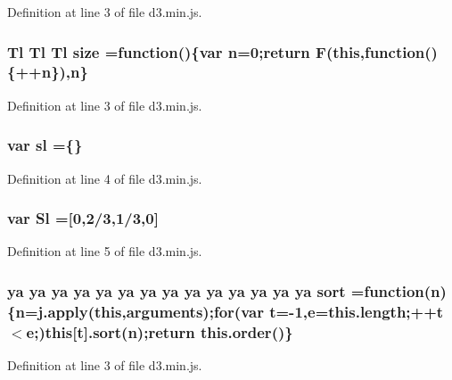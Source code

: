 Definition at line 3 of file d3.\+min.\+js.

\subsubsection[{size}]{ {\bf Tl} {\bf Tl} {\bf Tl} size =function()\{var {\bf n}=0;{\bf return} F({\bf this},function()\{++{\bf n}\}),{\bf n}\}}\label{d3_8min_8js_a8401d8331e4ea8db4ff155652d0778e8}


Definition at line 3 of file d3.\+min.\+js.

\subsubsection[{sl}]{\setlength{\rightskip}{0pt plus 5cm}var sl =\{\}}\label{d3_8min_8js_a22ed058533e24c768f8dc8118e8b648e}


Definition at line 4 of file d3.\+min.\+js.

\subsubsection[{Sl}]{\setlength{\rightskip}{0pt plus 5cm}var Sl =[0,2/3,1/3,0]}\label{d3_8min_8js_aaea013a5b5b0ff043bbedf3b923f4726}


Definition at line 5 of file d3.\+min.\+js.

\subsubsection[{sort}]{ {\bf ya} {\bf ya} {\bf ya} {\bf ya} {\bf ya} {\bf ya} {\bf ya} {\bf ya} {\bf ya} {\bf ya} {\bf ya} {\bf ya} {\bf ya} {\bf ya} sort =function({\bf n})\{{\bf n}=j.\+apply({\bf this},arguments);{\bf for}(var t=-\/1,{\bf e}=this.\+length;++t$<${\bf e};){\bf this}[t].sort({\bf n});{\bf return} {\bf this.\+order}()\}}\label{d3_8min_8js_a6bff60bfc34ea367ba16f79cf8049b13}


Definition at line 3 of file d3.\+min.\+js.

